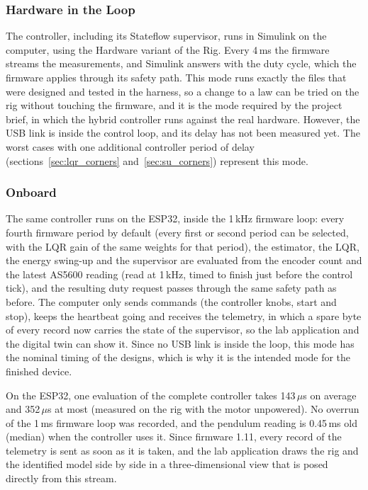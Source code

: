 \documentclass[a4paper,11pt]{article}
\begin{document}
\subsubsection{Hardware in the Loop}
The controller, including its Stateflow supervisor, runs in Simulink on the computer, using the Hardware variant of the Rig. Every 4\,ms the firmware streams the measurements, and Simulink answers with the duty cycle, which the firmware applies through its safety path. This mode runs exactly the files that were designed and tested in the harness, so a change to a law can be tried on the rig without touching the firmware, and it is the mode required by the project brief, in which the hybrid controller runs against the real hardware. However, the USB link is inside the control loop, and its delay has not been measured yet. The worst cases with one additional controller period of delay (sections~\ref{sec:lqr_corners} and~\ref{sec:su_corners}) represent this mode.

\subsubsection{Onboard}
The same controller runs on the ESP32, inside the 1\,kHz firmware loop: every fourth firmware period by default (every first or second period can be selected, with the LQR gain of the same weights for that period), the estimator, the LQR, the energy swing-up and the supervisor are evaluated from the encoder count and the latest AS5600 reading (read at 1\,kHz, timed to finish just before the control tick), and the resulting duty request passes through the same safety path as before. The computer only sends commands (the controller knobs, start and stop), keeps the heartbeat going and receives the telemetry, in which a spare byte of every record now carries the state of the supervisor, so the lab application and the digital twin can show it. Since no USB link is inside the loop, this mode has the nominal timing of the designs, which is why it is the intended mode for the finished device.

On the ESP32, one evaluation of the complete controller takes 143\,$\mu$s on average and 352\,$\mu$s at most (measured on the rig with the motor unpowered). No overrun of the 1\,ms firmware loop was recorded, and the pendulum reading is 0.45\,ms old (median) when the controller uses it. Since firmware 1.11, every record of the telemetry is sent as soon as it is taken, and the lab application draws the rig and the identified model side by side in a three-dimensional view that is posed directly from this stream.
\end{document}
